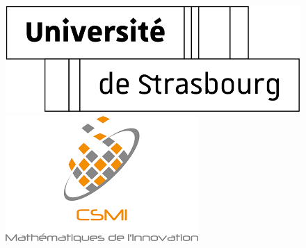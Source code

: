 \documentclass[ 
11pt, %
french, %
singlespacing, %
parskip, %
headsepline, %
openany, %
]{MastersDoctoralThesis} %
\author{Roussel Desmond \textsc{Nzoyem}} %
\numberwithin{theorem}{section}  %
\begin{document}
\frontmatter %

\pagestyle{plain} %


\begin{titlepage}

\begin{figure}[!htb]
   \begin{minipage}{0.24\textwidth}
     \centering
     \vspace*{12pt}
     \includegraphics[width=.99\linewidth]{LogoUnistra2.png}
   \end{minipage}\hspace*{7pt}
   \begin{minipage}{0.24\textwidth}
    \centering
    \includegraphics[width=.99\linewidth]{LogoCSMI.png}
  \end{minipage}\hfill
   \begin{minipage}{0.24\textwidth}
     \centering

\end{minipage}
\end{figure}
\end{titlepage}
\end{document}
